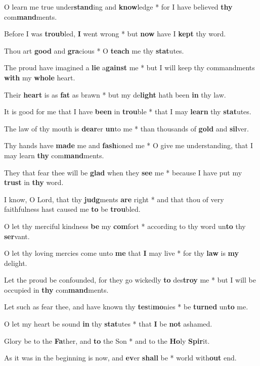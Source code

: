 \begin{multicols}{2}
	O learn me true under\textbf{stand}ing and \textbf{know}ledge * for I have believed \textbf{thy} com\textbf{mand}ments.
	
	Before I was \textbf{troub}led, \textbf{I} went wrong * but \textbf{now} have I \textbf{kept} thy word.
	
	Thou art \textbf{good} and \textbf{gra}cious * O \textbf{teach} me thy \textbf{stat}utes.
	
	The proud have imagined a \textbf{lie} a\textbf{gainst} me * but I will keep thy commandments \textbf{with} my \textbf{whole} heart.
	
	Their \textbf{heart} is as \textbf{fat} as brawn * but my de\textbf{light} hath been \textbf{in} thy law.
	
	It is good for me that I have \textbf{been} in \textbf{trou}ble * that I may \textbf{learn} thy \textbf{stat}utes.
	
	The law of thy mouth is \textbf{dear}er \textbf{un}to me * than thousands of \textbf{gold} and \textbf{sil}ver.
	
	Thy hands have \textbf{made} me and \textbf{fash}ioned me * O give me understanding, that I may learn \textbf{thy} com\textbf{mand}ments.
	
	They that fear thee will be \textbf{glad} when they \textbf{see} me * because I have put my \textbf{trust} in \textbf{thy} word.
	
	I know, O Lord, that thy \textbf{judg}ments \textbf{are} right * and that thou of very faithfulness hast caused me \textbf{to} be \textbf{trou}bled.
	
	O let thy merciful kindness \textbf{be} my \textbf{com}fort * according to thy word un\textbf{to} thy \textbf{ser}vant.
	
	O let thy loving mercies come unto \textbf{me} that \textbf{I} may live * for thy \textbf{law} is \textbf{my} delight.
	
	Let the proud be confounded, for they go wickedly \textbf{to} des\textbf{troy} me * but I will be occupied in \textbf{thy} com\textbf{mand}ments.
	
	Let such as fear thee, and have known thy \textbf{tes}ti\textbf{mo}nies * be \textbf{turned} un\textbf{to} me.
	
	O let my heart be sound \textbf{in} thy \textbf{stat}utes * that \textbf{I} be \textbf{not} ashamed.
	
	Glory be to the \textbf{Fa}ther, and \textbf{to} the Son * and to the \textbf{Ho}ly \textbf{Spir}it.
	
	As it was in the beginning is now, and \textbf{ev}er \textbf{shall} be * world with\textbf{out} end.
\end{multicols}